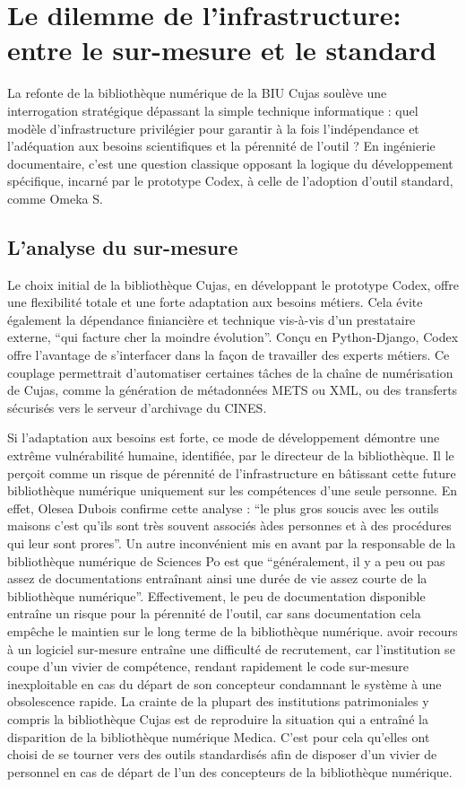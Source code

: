 \section[Dilemme de l'infrastructure]{Le dilemme de l'infrastructure: entre le sur-mesure et le standard}
La refonte de la bibliothèque numérique de la BIU Cujas soulève une interrogation stratégique dépassant la simple technique informatique : quel modèle d'infrastructure privilégier pour garantir à la fois l'indépendance et l'adéquation aux besoins scientifiques et la pérennité de l'outil ? En ingénierie documentaire, c'est une question classique opposant la logique du développement spécifique, incarné par le prototype Codex, à celle de l'adoption d'outil standard, comme Omeka S.

\subsection{L'analyse du sur-mesure}
Le choix initial de la bibliothèque Cujas, en développant le prototype Codex, offre une flexibilité totale et une forte adaptation aux besoins métiers. Cela évite également la dépendance finiancière et technique vis-à-vis d'un prestataire externe, \enquote{qui facture cher la moindre évolution}. Conçu en Python-Django, Codex offre l'avantage de s'interfacer dans la façon de travailler des experts métiers. Ce couplage permettrait  d'automatiser certaines tâches de la chaîne de numérisation de Cujas, comme la génération de métadonnées METS ou XML, ou des transferts sécurisés vers le serveur d'archivage du CINES.

Si l'adaptation aux besoins est forte, ce mode de développement démontre une extrême vulnérabilité humaine, identifiée, par le directeur de la bibliothèque. Il le perçoit comme un risque de pérennité de l'infrastructure en bâtissant cette future bibliothèque numérique uniquement sur les compétences d'une seule personne. En effet, Olesea Dubois confirme cette analyse : \enquote{le plus gros soucis avec les outils maisons c'est qu'ils sont très souvent associés àdes personnes et à des procédures qui leur sont prores}. Un autre inconvénient mis en avant par la responsable de la bibliothèque numérique de Sciences Po est que \enquote{généralement, il y a peu ou pas assez de documentations entraînant ainsi une durée de vie assez courte de la bibliothèque numérique}. Effectivement, le peu de documentation disponible entraîne un risque pour la pérennité de l'outil, car sans documentation cela empêche le maintien sur le long terme de la bibliothèque numérique. avoir recours à un logiciel sur-mesure entraîne une difficulté de recrutement, car l'institution se coupe d'un vivier de compétence, rendant rapidement le code sur-mesure inexploitable en cas du départ de son concepteur condamnant le système à une obsolescence rapide. La crainte de la plupart des institutions patrimoniales y compris la bibliothèque Cujas est de reproduire la situation qui a entraîné la disparition de la bibliothèque numérique Medica. C'est pour cela qu'elles ont choisi de se tourner vers des outils standardisés afin de disposer d'un vivier de personnel en cas de départ de l'un des concepteurs de la bibliothèque numérique.

